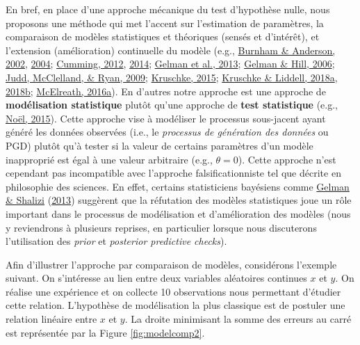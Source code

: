 \documentclass[
  a4paper,11pt,twoside,onecolumn,openright,final,oldfontcommands]{memoir}
\theoremstyle{definition}
\theoremstyle{definition}
\theoremstyle{definition}
\theoremstyle{remark}
\begin{document}
En bref, en place d'une approche mécanique du test d'hypothèse nulle, nous proposons une méthode qui met l'accent sur l'estimation de paramètres, la comparaison de modèles statistiques et théoriques (sensés et d'intérêt), et l'extension (amélioration) continuelle du modèle (e.g., \protect\hyperlink{ref-burnham_model_2002}{Burnham \& Anderson, 2002}, \protect\hyperlink{ref-burnham_multimodel_2004}{2004}; \protect\hyperlink{ref-Cumming2012}{Cumming, 2012}, \protect\hyperlink{ref-cumming_new_2014}{2014}; \protect\hyperlink{ref-gelman_bayesian_2013}{Gelman et al., 2013}; \protect\hyperlink{ref-gelman_data_2006}{Gelman \& Hill, 2006}; \protect\hyperlink{ref-judd_data_2009}{Judd, McClelland, \& Ryan, 2009}; \protect\hyperlink{ref-kruschke_doing_2015}{Kruschke, 2015}; \protect\hyperlink{ref-kruschke_bayesian_2018}{Kruschke \& Liddell, 2018a}, \protect\hyperlink{ref-kruschke_bayesian_2018-1}{2018b}; \protect\hyperlink{ref-R-rethinking}{McElreath, 2016a}). En d'autres notre approche est une approche de \textbf{modélisation statistique} plutôt qu'une approche de \textbf{test statistique} (e.g., \protect\hyperlink{ref-noel_psychologie_2015}{Noël, 2015}). Cette approche vise à modéliser le processus sous-jacent ayant généré les données observées (i.e., le \emph{processus de génération des données} ou PGD) plutôt qu'à tester si la valeur de certains paramètres d'un modèle inapproprié est égal à une valeur arbitraire (e.g., \(\theta = 0\)). Cette approche n'est cependant pas incompatible avec l'approche falsificationniste tel que décrite en philosophie des sciences. En effet, certains statisticiens bayésiens comme \protect\hyperlink{ref-gelman_philosophy_2013}{Gelman \& Shalizi} (\protect\hyperlink{ref-gelman_philosophy_2013}{2013}) suggèrent que la réfutation des modèles statistiques joue un rôle important dans le processus de modélisation et d'amélioration des modèles (nous y reviendrons à plusieurs reprises, en particulier lorsque nous discuterons l'utilisation des \emph{prior} et \emph{posterior predictive checks}).

Afin d'illustrer l'approche par comparaison de modèles, considérons l'exemple suivant. On s'intéresse au lien entre deux variables aléatoires continues \(x\) et \(y\). On réalise une expérience et on collecte 10 observations nous permettant d'étudier cette relation. L'hypothèse de modélisation la plus classique est de postuler une relation linéaire entre \(x\) et \(y\). La droite minimisant la somme des erreurs au carré est représentée par la Figure \ref{fig:modelcomp2}.
\end{document}
